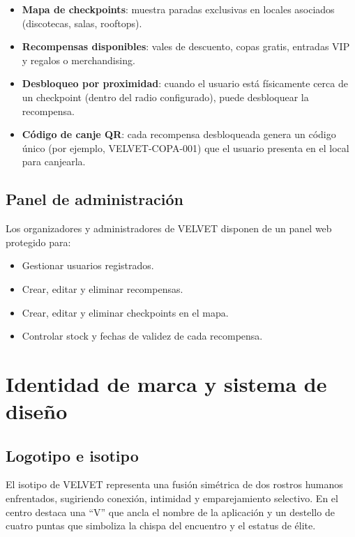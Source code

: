 \documentclass[11pt,a4paper]{article}
\begin{document}
\begin{itemize}[leftmargin=*]
  \item \textbf{Mapa de checkpoints}: muestra paradas exclusivas en locales asociados (discotecas, salas, rooftops).
  \item \textbf{Recompensas disponibles}: vales de descuento, copas gratis, entradas VIP y regalos o merchandising.
  \item \textbf{Desbloqueo por proximidad}: cuando el usuario está físicamente cerca de un checkpoint (dentro del radio configurado), puede desbloquear la recompensa.
  \item \textbf{Código de canje QR}: cada recompensa desbloqueada genera un código único (por ejemplo, VELVET-COPA-001) que el usuario presenta en el local para canjearla.
\end{itemize}

\subsection{Panel de administración}

Los organizadores y administradores de VELVET disponen de un panel web protegido para:

\begin{itemize}[leftmargin=*]
  \item Gestionar usuarios registrados.
  \item Crear, editar y eliminar recompensas.
  \item Crear, editar y eliminar checkpoints en el mapa.
  \item Controlar stock y fechas de validez de cada recompensa.
\end{itemize}

\section{Identidad de marca y sistema de diseño}

\subsection{Logotipo e isotipo}

El isotipo de VELVET representa una fusión simétrica de dos rostros humanos enfrentados, sugiriendo conexión, intimidad y emparejamiento selectivo. En el centro destaca una ``V'' que ancla el nombre de la aplicación y un destello de cuatro puntas que simboliza la chispa del encuentro y el estatus de élite.
\end{document}

